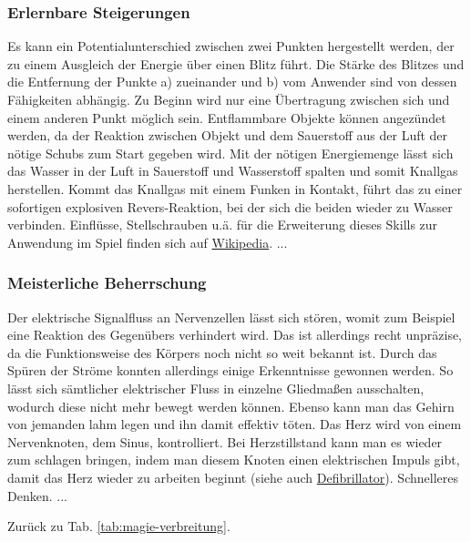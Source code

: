 \subsubsection{Erlernbare Steigerungen}
\begin{outline}
	\1 Es kann ein Potentialunterschied zwischen zwei Punkten hergestellt werden, der zu einem Ausgleich der Energie über einen Blitz führt.
	Die Stärke des Blitzes und die Entfernung der Punkte a) zueinander und b) vom Anwender sind von dessen Fähigkeiten abhängig.
	Zu Beginn wird nur eine Übertragung zwischen sich und einem anderen Punkt möglich sein.
	\1 Entflammbare Objekte können angezündet werden, da der Reaktion zwischen Objekt und dem Sauerstoff aus der Luft der nötige Schubs zum Start gegeben wird.
	\1 Mit der nötigen Energiemenge lässt sich das Wasser in der Luft in Sauerstoff und Wasserstoff spalten und somit Knallgas herstellen.
	Kommt das Knallgas mit einem Funken in Kontakt, führt das zu einer sofortigen explosiven Revers-Reaktion, bei der sich die beiden wieder zu Wasser verbinden.
	Einflüsse, Stellschrauben u.ä. für die Erweiterung dieses Skills zur Anwendung im Spiel finden sich \zB auf \href{https://de.wikipedia.org/wiki/Knallgas}{Wikipedia}.
	\1 ...
\end{outline}

\subsubsection{Meisterliche Beherrschung} 
\begin{outline}
	\1 Der elektrische Signalfluss an Nervenzellen lässt sich stören, womit zum Beispiel eine Reaktion des Gegenübers verhindert wird. 
	Das ist allerdings recht unpräzise, da die Funktionsweise des Körpers noch nicht so weit bekannt ist. 
	Durch das Spüren der Ströme konnten allerdings einige Erkenntnisse gewonnen werden. 
	So lässt sich \zB sämtlicher elektrischer Fluss in einzelne Gliedmaßen ausschalten, wodurch diese nicht mehr bewegt werden können.
	\1 Ebenso kann man das Gehirn von jemanden lahm legen und ihn damit effektiv töten.
	\1 Das Herz wird von einem Nervenknoten, dem Sinus, kontrolliert. 
	Bei Herzstillstand kann man es wieder zum schlagen bringen, indem man diesem Knoten einen elektrischen Impuls gibt, damit das Herz wieder zu arbeiten beginnt (siehe auch \href{https://de.wikipedia.org/wiki/Defibrillator}{Defibrillator}).
	\1 Schnelleres Denken.
	\1 ...
\end{outline}
Zurück zu Tab. \ref{tab:magie-verbreitung}.




